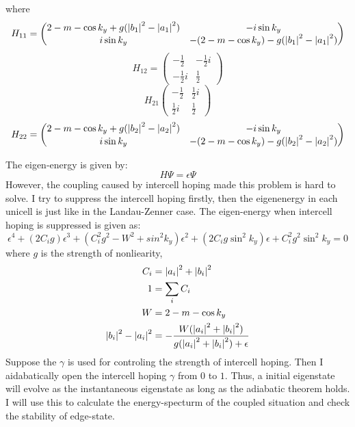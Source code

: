 \documentclass[fontsize=11pt, %
                             paper=a4, %
                             twoside, %
                             captions=tableheading,
                             index=totoc,
                             hyperref]{labbook}
\begin{document}
\begin{addmargin}[4cm]{0cm}
where
\begin{equation}
H_{11}=
\begin{pmatrix}
2-m-\cos k_y + g(\left| b_1 \right|^2-\left| a_1 \right|^2)& -i\sin k_y\\
i\sin k_y&-(2-m-\cos k_y)-g(\left| b_1 \right|^2-\left| a_1 \right|^2)\\
\end{pmatrix}
\end{equation}
\begin{equation}
H_{12}=
\begin{pmatrix}
-\frac{1}{2}&-\frac{1}{2}i\\
-\frac{1}{2}i&\frac{1}{2}
\end{pmatrix}
\end{equation}
\begin{equation}
H_{21}
\begin{pmatrix}
-\frac{1}{2}&\frac{1}{2}i\\
\frac{1}{2}i&\frac{1}{2}
\end{pmatrix}
\end{equation}
\begin{equation}
H_{22}=
\begin{pmatrix}
2-m-\cos k_y + g(\left| b_2 \right|^2-\left| a_2 \right|^2)& -i\sin k_y\\
i\sin k_y&-(2-m-\cos k_y)-g(\left| b_2 \right|^2-\left| a_2 \right|^2)\\
\end{pmatrix}
\end{equation}

The eigen-energy is given by:
\begin{equation}
H \Psi=\epsilon \Psi
\end{equation}
However, the coupling caused by intercell hoping made this problem is hard to solve. I try to suppress the intercell hoping firstly, then the eigenenergy in each unicell is just like in the Landau-Zenner case. The eigen-energy when intercell hoping is suppressed is given as:
\begin{equation}
\epsilon^4+(2C_i g)\epsilon^3+(C_i^2 g^2 -W^2+sin^2k_y)\epsilon^2+(2C_i g \sin^2k_y)\epsilon + C_i^2g^2\sin^2k_y=0
\end{equation}
where $g$ is the strength of nonliearity, 
\begin{equation}
\begin{aligned}
C_i&=\left| a_i \right|^2+\left| b_i \right|^2\\
1&=\sum_i C_i\\
W&=2-m-\cos k_y\\
\left| b_i \right|^2-\left| a_i \right|^2&=-\frac{W(\left| a_i \right|^2+\left| b_i \right|^2)}{g(\left| a_i \right|^2+\left| b_i \right|^2)+\epsilon}
\end{aligned}
\end{equation}
Suppose the $\gamma$ is used for controling the strength of intercell hoping. Then I aidabatically open the intercell hoping $\gamma$ from $0$ to $1$. Thus, a initial eigenstate will evolve as the instantaneous eigenstate as long as the adiabatic theorem holds. I will use this to calculate the energy-specturm of the coupled situation and check the stability of edge-state.


\end{addmargin}
\end{document}
